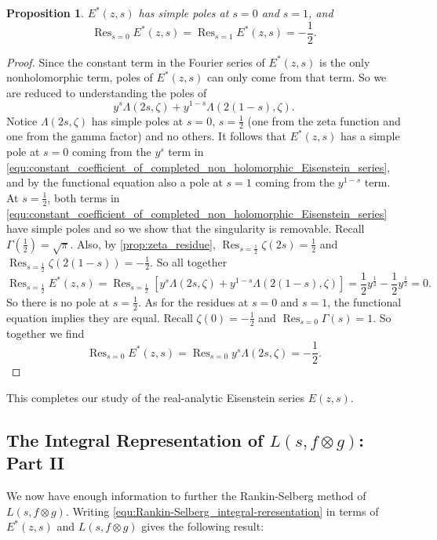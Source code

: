 \documentclass[12pt]{book}
\newtheorem{proposition}{Proposition}[section]
\theoremstyle{definition}\newframedtheorem{method}{Method}
\newcommand{\z}{\zeta}
\newcommand{\G}{\Gamma}
\renewcommand{\L}{\Lambda}
\newcommand{\ox}{\otimes}
\newcommand{\<}{\langle}
\renewcommand{\>}{\rangle}
\DeclareMathOperator*{\Res}{\mathrm{Res}}
\begin{document}
      \begin{proposition}\label{equ:completed_real-analytic_Eisenstein_series_residues}
        $E^{\ast}(z,s)$ has simple poles at $s = 0$ and $s = 1$, and
        \[
          \Res_{s = 0}E^{\ast}(z,s) = \Res_{s = 1}E^{\ast}(z,s) = -\frac{1}{2}.
        \]
      \end{proposition}
      \begin{proof}
        Since the constant term in the Fourier series of $E^{\ast}(z,s)$ is the only nonholomorphic term, poles of $E^{\ast}(z,s)$ can only come from that term. So we are reduced to understanding the poles of
        \begin{equation}\label{equ:constant_coefficient_of_completed_non_holomorphic_Eisenstein_series}
            y^{s}\L(2s,\z)+y^{1-s}\L(2(1-s),\z).
        \end{equation}
        Notice $\L(2s,\z)$ has simple poles at $s = 0$, $s = \frac{1}{2}$ (one from the zeta function and one from the gamma factor) and no others. It follows that $E^{\ast}(z,s)$ has a simple pole at $s = 0$ coming from the $y^{s}$ term in
        \cref{equ:constant_coefficient_of_completed_non_holomorphic_Eisenstein_series}, and by the functional equation also a pole at $s = 1$ coming from the $y^{1-s}$ term. At $s = \frac{1}{2}$, both terms in \cref{equ:constant_coefficient_of_completed_non_holomorphic_Eisenstein_series} have simple poles and so we show that the singularity is removable. Recall $\G\left(\frac{1}{2}\right) = \sqrt{\pi}$. Also, by \cref{prop:zeta_residue}, $\Res_{s = \frac{1}{2}}\z(2s) = \frac{1}{2}$ and $\Res_{s = \frac{1}{2}}\z(2(1-s)) = -\frac{1}{2}$. So all together
        \[
          \Res_{s = \frac{1}{2}}E^{\ast}(z,s) = \Res_{s = \frac{1}{2}}[y^{s}\L(2s,\z)+y^{1-s}\L(2(1-s),\z)] = \frac{1}{2}y^{\frac{1}{2}}-\frac{1}{2}y^{\frac{1}{2}} = 0.
        \]
        So there is no pole at $s = \frac{1}{2}$. As for the residues at $s = 0$ and $s = 1$, the functional equation implies they are equal. Recall $\z(0) = -\frac{1}{2}$ and $\Res_{s = 0}\G(s) = 1$. So together we find
        \[
          \Res_{s = 0}E^{\ast}(z,s) = \Res_{s = 0}y^{s}\L(2s,\z) = -\frac{1}{2}.
        \]
      \end{proof}

      This completes our study of the real-analytic Eisenstein series $E(z,s)$.
    \subsection*{The Integral Representation of \texorpdfstring{$L(s,f \ox g)$}{L(s,fxg)}: Part II}
      We now have enough information to further the Rankin-Selberg method of $L(s,f \ox g)$. Writing \cref{equ:Rankin-Selberg_integral-reresentation} in terms of $E^{\ast}(z,s)$ and $L(s,f \ox g)$ gives the following result:
\end{document}
